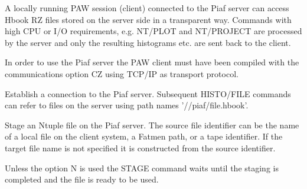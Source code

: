    \par
A locally running PAW session (client) connected to the Piaf server can 
   access Hbook RZ files stored on the server side in a transparent way.  
   Commands with high CPU or I/O requirements, e.g. NT/PLOT and NT/PROJECT are 
   processed by the server and only the resulting histograms etc. are sent 
   back to the client.  

   \par
In order to use the Piaf server the PAW client must have been compiled with 
   the communications option CZ using TCP/IP as transport protocol.  


\fi


\BEGARG
{}
\ENDARG

   \par
Establish a connection to the Piaf server.  Subsequent HISTO/FILE commands 
   can refer to files on the server using path names '//piaf/file.hbook'.  

\ENDCMD


\BEGARG
{}
\ENDARG
{}
\ENDOPT

   \par
Stage an Ntuple file on the Piaf server.  The source file identifier can be 
   the name of a local file on the client system, a Fatmen path, or a tape 
   identifier.  If the target file name is not specified it is constructed 
   from the source identifier.  

   \par
Unless the option N is used the STAGE command waits until the staging is 
   completed and the file is ready to be used.  

\ENDCMD


\BEGARG
{}
\ENDARG
{}
\ENDOPT

